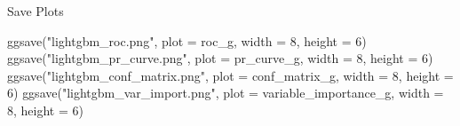 \documentclass[
  letterpaper,
  DIV=11,
  numbers=noendperiod]{scrartcl}
\newenvironment{Shaded}{\begin{snugshade}}{\end{snugshade}}
\newcommand{\AttributeTok}[1]{\textcolor[rgb]{0.40,0.45,0.13}{#1}}
\newcommand{\DecValTok}[1]{\textcolor[rgb]{0.68,0.00,0.00}{#1}}
\newcommand{\FunctionTok}[1]{\textcolor[rgb]{0.28,0.35,0.67}{#1}}
\newcommand{\NormalTok}[1]{\textcolor[rgb]{0.00,0.23,0.31}{#1}}
\newcommand{\StringTok}[1]{\textcolor[rgb]{0.13,0.47,0.30}{#1}}
\begin{document}
Save Plots

\begin{Shaded}
\begin{Highlighting}[]
\FunctionTok{ggsave}\NormalTok{(}\StringTok{"lightgbm\_roc.png"}\NormalTok{, }\AttributeTok{plot =}\NormalTok{ roc\_g, }\AttributeTok{width =} \DecValTok{8}\NormalTok{, }\AttributeTok{height =} \DecValTok{6}\NormalTok{)}
\FunctionTok{ggsave}\NormalTok{(}\StringTok{"lightgbm\_pr\_curve.png"}\NormalTok{, }\AttributeTok{plot =}\NormalTok{ pr\_curve\_g, }\AttributeTok{width =} \DecValTok{8}\NormalTok{, }\AttributeTok{height =} \DecValTok{6}\NormalTok{)}
\FunctionTok{ggsave}\NormalTok{(}\StringTok{"lightgbm\_conf\_matrix.png"}\NormalTok{, }\AttributeTok{plot =}\NormalTok{ conf\_matrix\_g, }\AttributeTok{width =} \DecValTok{8}\NormalTok{, }\AttributeTok{height =} \DecValTok{6}\NormalTok{)}
\FunctionTok{ggsave}\NormalTok{(}\StringTok{"lightgbm\_var\_import.png"}\NormalTok{, }\AttributeTok{plot =}\NormalTok{ variable\_importance\_g, }\AttributeTok{width =} \DecValTok{8}\NormalTok{, }
       \AttributeTok{height =} \DecValTok{6}\NormalTok{)}
\end{Highlighting}
\end{Shaded}
\end{document}
